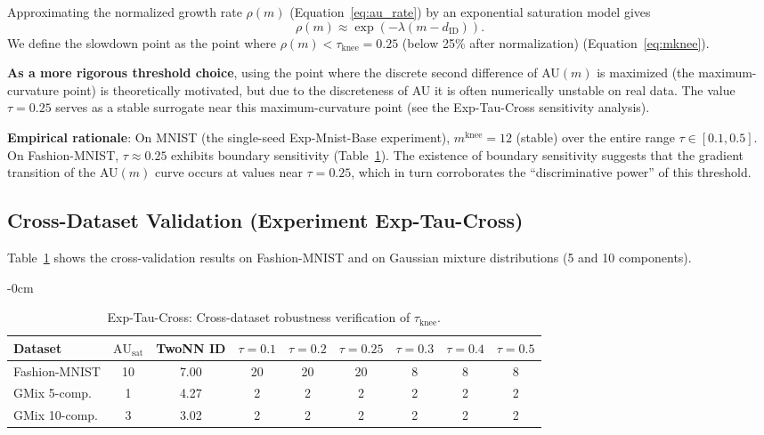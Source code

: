 \documentclass[make,article,submit,pdftex,moreauthors]{Definitions/mdpi}
\newcommand{\dID}{d_{\mathrm{ID}}}
\newcommand{\AUsat}{\mathrm{AU}_{\mathrm{sat}}}
\newcommand{\mknee}{m^{\mathrm{knee}}}
\begin{document}
Approximating the normalized growth rate $\rho(m)$
(Equation~\eqref{eq:au_rate}) by an exponential saturation model gives
\begin{equation}
  \rho(m) \approx \exp(-\lambda (m - \dID)).
  \label{eq:knee_curvature}
\end{equation}
We define the slowdown point as the point where
$\rho(m) < \tau_{\mathrm{knee}} = 0.25$ (below 25\% after normalization)
(Equation~\eqref{eq:mknee}).

\textbf{As a more rigorous threshold choice}, using the point where the discrete
second difference of AU$(m)$ is maximized (the maximum-curvature point) is
theoretically motivated, but due to the discreteness of AU it is often
numerically unstable on real data.
The value $\tau = 0.25$ serves as a stable surrogate near this maximum-curvature
point (see the Exp-Tau-Cross sensitivity analysis).

\textbf{Empirical rationale}:
On MNIST (the single-seed Exp-Mnist-Base experiment), $\mknee = 12$ (stable) over
the entire range $\tau \in [0.1, 0.5]$.
On Fashion-MNIST, $\tau \approx 0.25$ exhibits boundary sensitivity
(Table~\ref{tab:ez}).
The existence of boundary sensitivity suggests that the gradient transition of
the AU$(m)$ curve occurs at values near $\tau = 0.25$, which in turn corroborates
the ``discriminative power'' of this threshold.

\subsection*{Cross-Dataset Validation (Experiment Exp-Tau-Cross)}

Table~\ref{tab:ez} shows the cross-validation results on Fashion-MNIST and on
Gaussian mixture distributions (5 and 10 components).

\begin{table}[H]
\begin{adjustwidth}{-\extralength}{0cm}
\centering
\caption{Exp-Tau-Cross: Cross-dataset robustness verification of $\tau_{\mathrm{knee}}$.}
\label{tab:ez}
\small
\begin{tabular}{lcc|cccccc}
\toprule
Dataset & $\AUsat$ & TwoNN ID & $\tau=0.1$ & $\tau=0.2$ & $\tau=0.25$ & $\tau=0.3$ & $\tau=0.4$ & $\tau=0.5$ \\
\midrule
Fashion-MNIST & 10 & 7.00 & 20 & 20 & 20 & 8 & 8 & 8 \\
GMix 5-comp. & 1 & 4.27 & 2 & 2 & 2 & 2 & 2 & 2 \\
GMix 10-comp. & 3 & 3.02 & 2 & 2 & 2 & 2 & 2 & 2 \\
\bottomrule
\end{tabular}
\end{adjustwidth}
\end{table}
\end{document}
